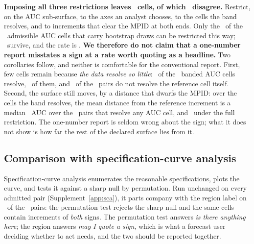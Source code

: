 \textbf{Imposing all three restrictions leaves \nCellsFullyRestricted\ cells,
of which \nDisagreeFullyRestricted\ disagree.} Restrict, on the AUC
sub-surface, to the axes an analyst chooses, to the cells the band resolves,
and to increments that clear the MPID at both ends. Only the
\nInferenceCells\ of the \nCellsAuc\ admissible AUC cells that carry
bootstrap draws can be restricted this way; \nCellsFullyRestricted\ survive,
and the rate is \misreportFullyRestrictedPct. \textbf{We therefore do not
claim that a one-number report misstates a sign at a rate worth quoting as a
headline.} Two corollaries follow, and neither is comfortable for the
conventional report. First, few cells remain because \emph{the data resolve
so little}: \nCellsResolvedAuc\ of the \nInferenceCells\ banded AUC cells
resolve, \shareResolvedAucPct\ of them, and \nRefUnresolvedCell\ of the
\nPairs\ pairs do not resolve the reference cell itself. Second, the surface
still moves, by a distance that dwarfs the MPID: over the cells the band
resolves, the mean distance from the reference increment is a median
\madResolvedMedian\ AUC over the \nPairsMadResolved\ pairs that resolve any AUC
cell, and \madFullyRestrictedMedian\ under the full restriction. The
one-number report is seldom wrong about the sign; what it does not show is
how far the rest of the declared surface lies from it.

\subsection{Comparison with specification-curve analysis}
\label{sec:sca}

Specification-curve analysis \citep{simonsohn2020specification} enumerates
the reasonable specifications, plots the curve, and tests it against a sharp
null by permutation. Run unchanged on every admitted pair
(Supplement~\ref{app:sca}), it parts company with the region label on
\nScaDisagree\ of the \nScaPairs\ pairs: the permutation test rejects the
sharp null and the same cells contain increments of \emph{both} signs. The
permutation test answers \emph{is there anything here}; the region answers
\emph{may I quote a sign}, which is what a forecast user deciding whether to
act needs, and the two should be reported together.
